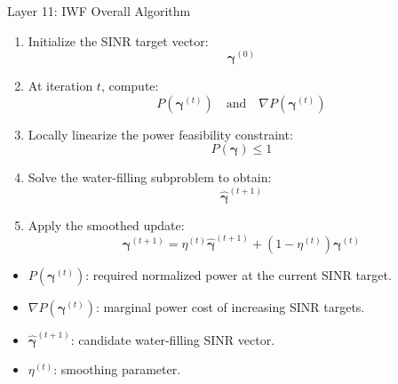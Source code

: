 \documentclass{beamer}
\begin{document}
\begin{frame}{Layer 11: IWF Overall Algorithm}
\scriptsize

\begin{enumerate}
    \item Initialize the SINR target vector:
    \[
        \boldsymbol{\gamma}^{(0)}
    \]

    \item At iteration \(t\), compute:
    \[
        P(\boldsymbol{\gamma}^{(t)})
        \quad \text{and} \quad
        \nabla P(\boldsymbol{\gamma}^{(t)})
    \]

    \item Locally linearize the power feasibility constraint:
    \[
        P(\boldsymbol{\gamma})\le1
    \]

    \item Solve the water-filling subproblem to obtain:
    \[
        \widehat{\boldsymbol{\gamma}}^{(t+1)}
    \]

    \item Apply the smoothed update:
    \[
        \boldsymbol{\gamma}^{(t+1)}
        =
        \eta^{(t)}
        \widehat{\boldsymbol{\gamma}}^{(t+1)}
        +
        (1-\eta^{(t)})
        \boldsymbol{\gamma}^{(t)}
    \]
\end{enumerate}

\begin{itemize}
    \item \(P(\boldsymbol{\gamma}^{(t)})\): required normalized power at the current SINR target.
    \item \(\nabla P(\boldsymbol{\gamma}^{(t)})\): marginal power cost of increasing SINR targets.
    \item \(\widehat{\boldsymbol{\gamma}}^{(t+1)}\): candidate water-filling SINR vector.
    \item \(\eta^{(t)}\): smoothing parameter.
\end{itemize}

\end{frame}
\end{document}
